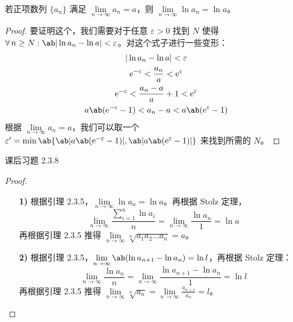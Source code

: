 \begin{lemma}
	若正项数列 $\{a_n\}$ 满足 $\lim\limits_{n \to \infty} a_n = a$，则 $\lim\limits_{n \to \infty} \ln a_n = \ln a$。

	\begin{proof}
		要证明这个，我们需要对于任意 $\varepsilon > 0$ 找到 $N$ 使得 $\forall\,n \ge N: \ab|\ln a_n - \ln a| < \varepsilon$。对这个式子进行一些变形：
		$$
		\begin{gathered}
			|\ln a_n - \ln a| < \varepsilon \\
			\E^{-\varepsilon} < \frac{a_n}{a} < \E^{\varepsilon} \\
			\E^{-\varepsilon} < \frac{a_n - a}{a} + 1 < \E^{\varepsilon} \\
			a \ab(\E^{-\varepsilon} - 1) < a_n - a < a \ab(\E^{\varepsilon} - 1) \\
		\end{gathered}
		$$
		根据 $\lim\limits_{n \to \infty} a_n = a$，我们可以取一个 $\varepsilon' = \min\ab\{\ab|a \ab(\E^{-\varepsilon} - 1)|, \ab|a \ab(\E^{\varepsilon} - 1)|\}$ 来找到所需的 $N$。
	\end{proof}
\end{lemma}

\begin{problem}
	课后习题 2.3.8

	\begin{proof}
		\begin{enumerate}
			\item[\textbf{1)}] 根据引理 2.3.5，$\lim\limits_{n \to \infty} \ln a_n = \ln a$。再根据 Stolz 定理，
			$$
			\lim_{n \to \infty} \frac{\sum_{i=1}^n \ln a_i}{n} = \lim_{n \to \infty} \frac{\ln a_n}{1} = \ln a
			$$
			再根据引理 2.3.5 推得 $\lim\limits_{n \to \infty} \sqrt[n]{a_1 a_2 \dots a_n} = a$。

			\item[\textbf{2)}] 根据引理 2.3.5，$\lim\limits_{n \to \infty} \ab(\ln a_{n+1} - \ln a_n) = \ln l$，再根据 Stolz 定理：
			$$
			\lim_{n \to \infty} \frac{\ln a_n}{n} = \lim_{n \to \infty} \frac{\ln a_{n+1} - \ln a_n}{1} = \ln l
			$$
			再根据引理 2.3.5 推得 $\lim\limits_{n \to \infty} \sqrt[n]{a_n} = \lim\limits_{n \to \infty} \frac{a_{n+1}}{a_n} = l$。
		\end{enumerate}
	\end{proof}
\end{problem}

